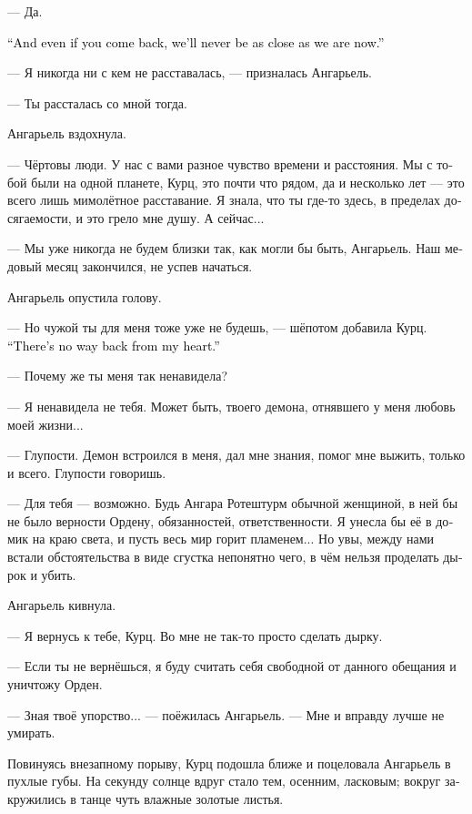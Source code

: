 \documentclass[a4paper,12pt,fleqn]{book}\usepackage{cooltooltips}\usepackage{polyglossia}\setdefaultlanguage[babelshorthands=true]{russian}\setotherlanguage{english}\defaultfontfeatures{Ligatures=TeX,Mapping=tex-text} \usepackage{xcolor}\definecolor{lightgray}{HTML}{bbbbbb}\color{lightgray}\newcommand{\ml}[3]{\textenglish{\textcolor{black}{#3}}}
\begin{document}
--- Да.

\ml{$0$}
{--- А если вернёшься, мы никогда не будем так близки.}
{``And even if you come back, we'll never be as close as we are now.''}

--- Я никогда ни с кем не расставалась, --- призналась Ангарьель.

--- Ты рассталась со мной тогда.

Ангарьель вздохнула.

--- Чёртовы люди.
У нас с вами разное чувство времени и расстояния.
Мы с тобой были на одной планете, Курц, это почти что рядом, да и несколько лет --- это всего лишь мимолётное расставание.
Я знала, что ты где-то здесь, в пределах досягаемости, и это грело мне душу.
А сейчас...

--- Мы уже никогда не будем близки так, как могли бы быть, Ангарьель.
Наш медовый месяц закончился, не успев начаться.

Ангарьель опустила голову.

--- Но чужой ты для меня тоже уже не будешь, --- шёпотом добавила Курц.
\ml{$0$}
{--- Из моего сердца обратной дороги нет.}
{``There's no way back from my heart.''}

--- Почему же ты меня так ненавидела?

--- Я ненавидела не тебя.
Может быть, твоего демона, отнявшего у меня любовь моей жизни...

--- Глупости.
Демон встроился в меня, дал мне знания, помог мне выжить, только и всего.
Глупости говоришь.

--- Для тебя --- возможно.
Будь Ангара Ротештурм обычной женщиной, в ней бы не было верности Ордену, обязанностей, ответственности.
Я унесла бы её в домик на краю света, и пусть весь мир горит пламенем...
Но увы, между нами встали обстоятельства в виде сгустка непонятно чего, в чём нельзя проделать дырок и убить.

Ангарьель кивнула.

--- Я вернусь к тебе, Курц.
Во мне не так-то просто сделать дырку.

--- Если ты не вернёшься, я буду считать себя свободной от данного обещания и уничтожу Орден.

--- Зная твоё упорство... --- поёжилась Ангарьель.
--- Мне и вправду лучше не умирать.

Повинуясь внезапному порыву, Курц подошла ближе и поцеловала Ангарьель в пухлые губы.
На секунду солнце вдруг стало тем, осенним, ласковым;
вокруг закружились в танце чуть влажные золотые листья.
\end{document}
